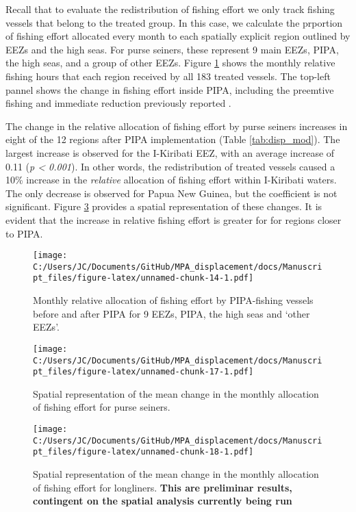 \documentclass[12pt,]{article}
\begin{document}
Recall that to evaluate the redistribution of fishing effort we only
track fishing vessels that belong to the treated group. In this case, we
calculate the prportion of fishing effort allocated every month to each
spatially explicit region outlined by EEZs and the high seas. For purse
seiners, these represent 9 main EEZs, PIPA, the high seas, and a group
of other EEZs. Figure \ref{fig:redist_trend_ps} shows the monthly
relative fishing hours that each region received by all 183 treated
vessels. The top-left pannel shows the change in fishing effort inside
PIPA, including the preemtive fishing and immediate reduction previously
reported \citep{mcdermott_2018}.

The change in the relative allocation of fishing effort by purse seiners
increases in eight of the 12 regions after PIPA implementation (Table
\ref{tab:disp_mod}). The largest increase is observed for the I-Kiribati
EEZ, with an average increase of 0.11 (\emph{p \textless{} 0.001}). In
other words, the redistribution of treated vessels caused a 10\%
increase in the \emph{relative} allocation of fishing effort within
I-Kiribati waters. The only decrease is observed for Papua New Guinea,
but the coefficient is not significant. Figure \ref{fig:map_change_ps}
provides a spatial representation of these changes. It is evident that
the increase in relative fishing effort is greater for for regions
closer to PIPA.

\begin{figure}
\centering
\texttt{[image: C:/Users/JC/Documents/GitHub/MPA\_displacement/docs/Manuscript\_files/figure-latex/unnamed-chunk-14-1.pdf]}
\caption{\label{fig:unnamed-chunk-14}\label{fig:redist_trend_ps}Monthly
relative allocation of fishing effort by PIPA-fishing vessels before and
after PIPA for 9 EEZs, PIPA, the high seas and `other EEZs'.}
\end{figure}

\begin{figure}
\centering
\texttt{[image: C:/Users/JC/Documents/GitHub/MPA\_displacement/docs/Manuscript\_files/figure-latex/unnamed-chunk-17-1.pdf]}
\caption{\label{fig:unnamed-chunk-17}\label{fig:map_change_ps}Spatial
representation of the mean change in the monthly allocation of fishing
effort for purse seiners.}
\end{figure}

\begin{figure}
\centering
\texttt{[image: C:/Users/JC/Documents/GitHub/MPA\_displacement/docs/Manuscript\_files/figure-latex/unnamed-chunk-18-1.pdf]}
\caption{\label{fig:unnamed-chunk-18}\label{fig:map_change_ps}Spatial
representation of the mean change in the monthly allocation of fishing
effort for longliners. \textbf{This are preliminar results, contingent
on the spatial analysis currently being run}}
\end{figure}
\end{document}
